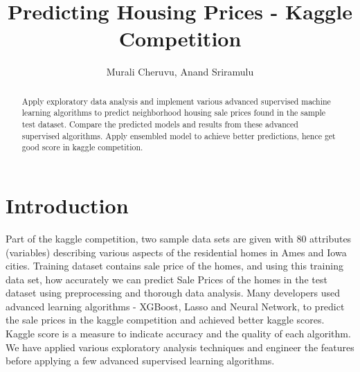 \documentclass[sigconf]{acmart}
\begin{document}
		
	\title{Predicting Housing Prices - Kaggle Competition}	
	
	\author{Murali Cheruvu, Anand Sriramulu}
	
	\renewcommand{\shortauthors}{M. Cheruvu, A Sriramulu}
	
	
	\begin{abstract}
		
	Apply exploratory data analysis and implement various advanced supervised machine learning algorithms to predict neighborhood housing sale prices found in the sample test dataset. Compare the predicted models and results from these advanced supervised algorithms. Apply ensembled model to achieve better predictions, hence get good score in kaggle competition.
	
	\end{abstract}
	
	
	\maketitle
	
	\section{Introduction} %
	
	Part of the kaggle competition, two sample data sets are given with 80 attributes (variables) describing various aspects of the residential homes in Ames and Iowa cities. Training dataset contains sale price of the homes, and using this training data set, how accurately we can predict Sale Prices of the homes in the test dataset using preprocessing and thorough data analysis. Many developers used advanced learning algorithms - XGBoost, Lasso and Neural Network, to predict the sale prices in the kaggle competition and achieved better kaggle scores. Kaggle score is a measure to indicate accuracy and the quality of each algorithm. We have applied various exploratory analysis techniques and engineer the features before applying a few advanced supervised learning algorithms.   
			
\end{document}
